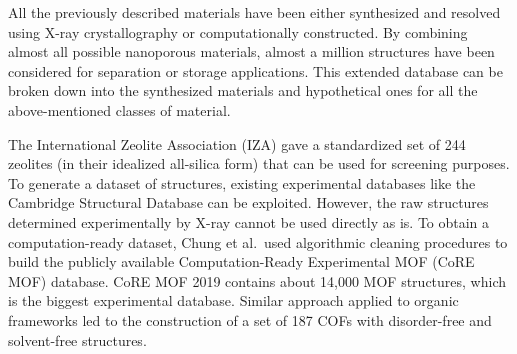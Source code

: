 \documentclass[main.tex]{subfiles}
\begin{document}
All the previously described materials have been either synthesized and resolved using X-ray crystallography or computationally constructed. By combining almost all possible nanoporous materials, almost a million structures have been considered for separation or storage applications.\cite{Simon_2015,Simon_2015_EES,Thornton_2017} This extended database can be broken down into the synthesized materials and hypothetical ones for all the above-mentioned classes of material.

The International Zeolite Association (IZA) gave a standardized set of 244 zeolites (in their idealized all-silica form) that can be used for screening purposes. To generate a dataset of structures, existing experimental databases like the Cambridge Structural Database can be exploited. However, the raw structures determined experimentally by X-ray cannot be used directly as is. To obtain a computation-ready dataset, Chung et al.\ used algorithmic cleaning procedures to build the publicly available Computation-Ready Experimental MOF (CoRE MOF) database.\cite{Chung_2014, Chung_2019} CoRE MOF 2019 contains about 14,000 MOF structures, which is the biggest experimental database. Similar approach applied to organic frameworks led to the construction of a set of 187 COFs with disorder-free and solvent-free structures.\cite{Tong_2017,Ongari_2019}
\end{document}
